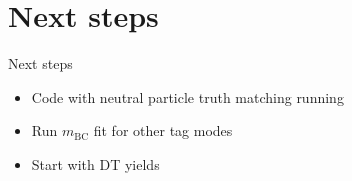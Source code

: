 \documentclass{beamer}
\begin{document}
\section{Next steps}
\begin{frame}{Next steps}
  \begin{itemize}
    \setlength\itemsep{2em}
    \item{Code with neutral particle truth matching running}
    \item{Run $m_\text{BC}$ fit for other tag modes}
    \item{Start with DT yields}
  \end{itemize}
\end{frame}
\end{document}
